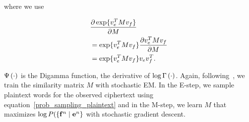 where we use 

\begin{align}
& \frac{\partial  \exp \{ v_{e}^ T M  v_{f} \} }{\partial M} \notag \\
& = \exp \{ v_{e}^ T M  v_{f} \} \frac{\partial  v_{e}^T M  v_{f} }{\partial M} \notag \\
& = \exp \{ v_{e}^ T M  v_{f} \} v_{e} v_{f}^T \notag.
\end{align}

$\Psi \left( \cdot \right)$ is the Digamma function, the derivative of $\log \Gamma \left( \cdot \right)$. Again, following~\cite{mimno2012topic}, we train the similarity matrix $M$ with stochastic EM. In the E-step, we sample plaintext words for the observed ciphertext using equation~\ref{prob_sampling_plaintext} and in the M-step, we learn $M$ that maximizes $\log P( \{ \mathbf{f}^n \mid \mathbf{e}^n \}$ with stochastic gradient descent. 

\iffalse
we will first derive the complete data log-likelihood for our model and then present the steps of our stochastic EM algorithm. For a particular ciphertext and plaintext bigram, For an english word $\word{e}$, 

We adopt the approach based on word context similarities to learn a better base distribution. However, our work is different from previous approach in the following ways: First, our work does not rely on any seed lexicon to learn the mapping between word context vectors, rather, it uses the results from sampling. Second, the mapping is not always fixed, but becomes better as the sampling process progresses. Last, but not least, the base distribution derived from the mapping and word contexts is used to improve decipherment.
\fi